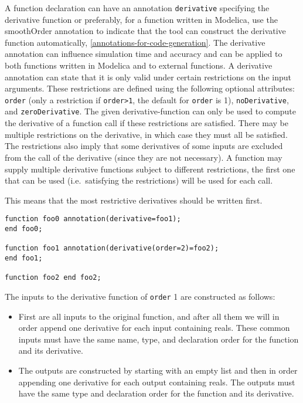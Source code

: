 A function declaration can have an annotation \lstinline!derivative! specifying the
derivative function or preferably, for a function written in Modelica,
use the smoothOrder annotation to indicate that the tool can construct
the derivative function automatically, \cref{annotations-for-code-generation}. The derivative
annotation can influence simulation time and accuracy and can be applied
to both functions written in Modelica and to external functions. A
derivative annotation can state that it is only valid under certain
restrictions on the input arguments. These restrictions are defined
using the following optional attributes: \lstinline!order! (only a restriction if
\lstinline!order>1!, the default for \lstinline!order! is 1), \lstinline!noDerivative!, and
\lstinline!zeroDerivative!. The given derivative-function can only be used to
compute the derivative of a function call if these restrictions are
satisfied. There may be multiple restrictions on the derivative, in
which case they must all be satisfied. The restrictions also imply that
some derivatives of some inputs are excluded from the call of the
derivative (since they are not necessary). A function may supply
multiple derivative functions subject to different restrictions, the
first one that can be used (i.e.\ satisfying the restrictions) will be
used for each call.

\begin{nonnormative}
This means that the most restrictive derivatives should be written first.
\end{nonnormative}

\begin{example}
\begin{lstlisting}[language=modelica]
function foo0 annotation(derivative=foo1);
end foo0;

function foo1 annotation(derivative(order=2)=foo2);
end foo1;

function foo2 end foo2;
\end{lstlisting}
\end{example}

The inputs to the derivative function of \lstinline!order! 1 are constructed as
follows:
\begin{itemize}
\item
  First are all inputs to the original function, and after all them we
  will in order append one derivative for each input containing reals.
  These common inputs must have the same name, type, and declaration
  order for the function and its derivative.
\item
  The outputs are constructed by starting with an empty list and then in
  order appending one derivative for each output containing reals. The
  outputs must have the same type and declaration order for the function
  and its derivative.
\end{itemize}

